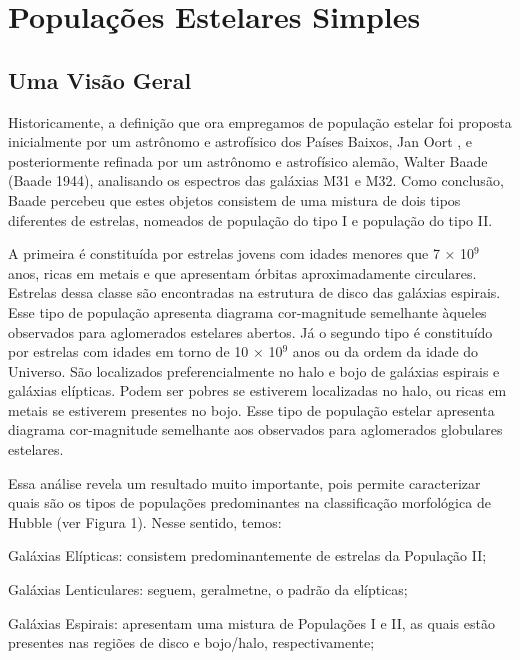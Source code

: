 
\chapter{Populações Estelares Simples}

\section{Uma Visão Geral}

Historicamente, a definição que ora empregamos de população estelar foi proposta inicialmente por um astrônomo e astrofísico dos Países Baixos, Jan Oort \cite{oort1926stars}, e posteriormente refinada por um astrônomo e astrofísico alemão, Walter Baade (Baade 1944), analisando os espectros das galáxias M31 e M32. Como conclusão, Baade percebeu que estes objetos consistem de uma mistura de dois tipos diferentes de estrelas, nomeados de população do tipo
I e população do tipo II. 

A primeira é constituída por estrelas jovens com idades menores que 7 × 10$^{9}$ anos, ricas em metais e que apresentam órbitas aproximadamente
circulares. Estrelas dessa classe são encontradas na estrutura de disco das galáxias espirais. Esse tipo de população apresenta diagrama cor-magnitude semelhante àqueles observados para aglomerados estelares abertos. Já o segundo tipo é constituído por estrelas com idades em torno de 10 × 10$^{9}$ anos ou da ordem da idade do Universo. São localizados preferencialmente no halo e bojo de galáxias espirais e galáxias elípticas. Podem ser pobres se estiverem localizadas no halo, ou ricas em metais
se estiverem presentes no bojo. Esse tipo de população estelar apresenta diagrama cor-magnitude semelhante aos observados para aglomerados globulares estelares.

Essa análise revela um resultado muito importante, pois permite caracterizar quais são os tipos de populações predominantes na classificação morfológica de Hubble (ver Figura 1). Nesse sentido, temos:

Galáxias Elípticas: consistem predominantemente de estrelas da População II;

Galáxias Lenticulares: seguem, geralmetne, o padrão da elípticas;

Galáxias Espirais: apresentam uma mistura de Populações I e II, as quais estão presentes nas regiões de disco e bojo/halo, respectivamente;

